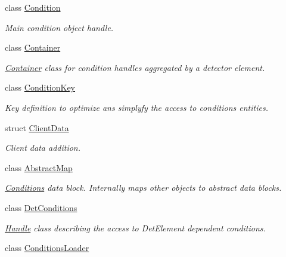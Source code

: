 \begin{DoxyCompactItemize}
class \hyperlink{class_d_d4hep_1_1_conditions_1_1_condition}{Condition}
\begin{DoxyCompactList}\small\item\em Main condition object handle. \item\end{DoxyCompactList}\item 
class \hyperlink{class_d_d4hep_1_1_conditions_1_1_container}{Container}
\begin{DoxyCompactList}\small\item\em \hyperlink{class_d_d4hep_1_1_conditions_1_1_container}{Container} class for condition handles aggregated by a detector element. \item\end{DoxyCompactList}\item 
class \hyperlink{class_d_d4hep_1_1_conditions_1_1_condition_key}{ConditionKey}
\begin{DoxyCompactList}\small\item\em Key definition to optimize ans simplyfy the access to conditions entities. \item\end{DoxyCompactList}\item 
struct \hyperlink{struct_d_d4hep_1_1_conditions_1_1_client_data}{ClientData}
\begin{DoxyCompactList}\small\item\em Client data addition. \item\end{DoxyCompactList}\item 
class \hyperlink{class_d_d4hep_1_1_conditions_1_1_abstract_map}{AbstractMap}
\begin{DoxyCompactList}\small\item\em \hyperlink{namespace_d_d4hep_1_1_conditions}{Conditions} data block. Internally maps other objects to abstract data blocks. \item\end{DoxyCompactList}\item 
class \hyperlink{class_d_d4hep_1_1_conditions_1_1_det_conditions}{DetConditions}
\begin{DoxyCompactList}\small\item\em \hyperlink{class_d_d4hep_1_1_handle}{Handle} class describing the access to DetElement dependent conditions. \item\end{DoxyCompactList}\item 
class \hyperlink{class_d_d4hep_1_1_conditions_1_1_conditions_loader}{ConditionsLoader}

\end{DoxyCompactItemize}
